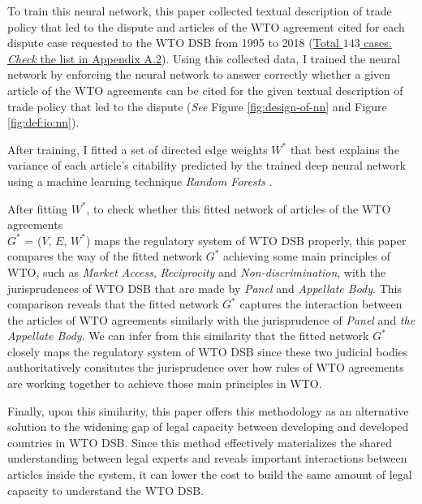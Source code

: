 
To train this neural network, this paper collected textual description of trade policy 
that led to the dispute and articles of the WTO agreement cited for each dispute
case requested to the WTO DSB 
from 1995 to 2018 (\hyperref[sub:cited-articles-table]{Total $143$ cases. \textit{Check} the list in Appendix A.2}).
Using this collected data, I trained the neural network by enforcing the neural network to answer correctly 
whether a given article of the WTO agreements
can be cited for the given textual description of 
trade policy that led to the dispute (\textit{See} Figure \ref{fig:design-of-nn} and Figure \ref{fig:def:io:nn}).

After training, I fitted a set of directed edge weights $W^*$ that 
best explains the variance of each article's citability predicted by the trained deep neural network using a machine learning technique \textit{Random Forests} \citep{rf, genie3}. 

After fitting $W^*$, to check whether this fitted network of articles of the WTO agreements\\  $G^*$ = ($V$, $E$, $W^*$) maps the regulatory system of WTO DSB properly, this paper
compares the way of the fitted network $G^*$ achieving some main principles of WTO, such as \textit{Market Access}, \textit{Reciprocity} and \textit{Non-discrimination}, 
with the jurisprudences of WTO DSB that are made by \textit{Panel} and \textit{Appellate Body}. This comparison reveals that the fitted network $G^*$ captures the interaction between the articles of WTO agreements
similarly with the jurisprudence of \textit{Panel} and \textit{the Appellate Body}. We can infer from this similarity that the fitted network $G^*$ closely maps the regulatory system of WTO DSB since these two judicial bodies 
authoritatively consitutes the jurisprudence over how rules of WTO agreements are working together 
to achieve those main principles in WTO.

Finally, upon this similarity, this paper offers this methodology as
an alternative solution to the widening gap of legal capacity between developing and developed countries in WTO DSB.
Since this method effectively materializes the shared understanding between legal experts and reveals important interactions between articles inside the system,
it can lower the cost to build the same amount of legal capacity to understand the WTO DSB.

